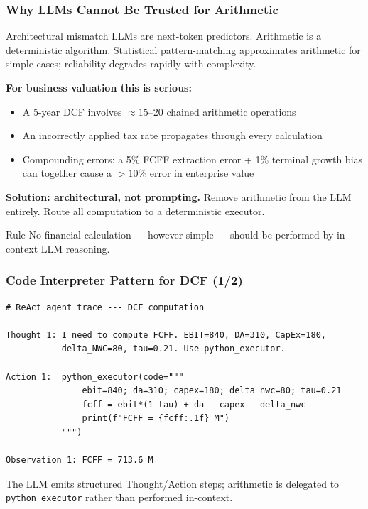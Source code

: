 \documentclass[9pt,t]{beamer}
\begin{document}
\begin{frame}
\frametitle{Why LLMs Cannot Be Trusted for Arithmetic}

\begin{block}{Architectural mismatch}
  LLMs are next-token predictors. Arithmetic is a deterministic algorithm.
  Statistical pattern-matching approximates arithmetic for simple cases;
  reliability degrades rapidly with complexity.
\end{block}

\medskip
\textbf{For business valuation this is serious:}
\begin{itemize}
  \item A 5-year DCF involves $\approx 15$--20 chained arithmetic operations
  \item An incorrectly applied tax rate propagates through every calculation
  \item Compounding errors: a 5\% FCFF extraction error + 1\% terminal growth bias
        can together cause a $>10\%$ error in enterprise value
\end{itemize}

\medskip
\textbf{Solution: architectural, not prompting.}
Remove arithmetic from the LLM entirely. Route all computation to a deterministic executor.

\medskip
\begin{alertblock}{Rule}
No financial calculation --- however simple --- should be performed by in-context LLM reasoning.
\end{alertblock}
\end{frame}

\begin{frame}[fragile]
\frametitle{Code Interpreter Pattern for DCF (1/2)}

\begin{lstlisting}[basicstyle=\ttfamily\scriptsize]
# ReAct agent trace --- DCF computation

Thought 1: I need to compute FCFF. EBIT=840, DA=310, CapEx=180,
           delta_NWC=80, tau=0.21. Use python_executor.

Action 1:  python_executor(code="""
               ebit=840; da=310; capex=180; delta_nwc=80; tau=0.21
               fcff = ebit*(1-tau) + da - capex - delta_nwc
               print(f"FCFF = {fcff:.1f} M")
           """)

Observation 1: FCFF = 713.6 M
\end{lstlisting}

The LLM emits structured Thought/Action steps; arithmetic is delegated to
\texttt{python\_executor} rather than performed in-context.
\end{frame}
\end{document}
